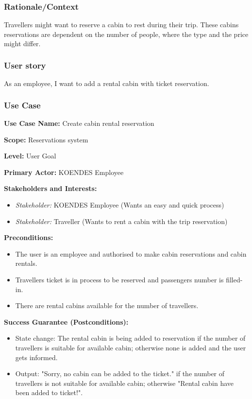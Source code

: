 \subsubsection{Rationale/Context}
Travellers might want to reserve a cabin to rest during their trip. These cabins reservations are dependent on the number of people, where the type and the price might differ.
\subsubsection{User story}
As an employee, I want to add a rental cabin with ticket reservation.
\subsubsection{Use Case}
\creator{\studentC}

\textbf{Use Case Name:} Create cabin rental reservation

\textbf{Scope:} Reservations system

\textbf{Level:} User Goal

\textbf{Primary Actor:} KOENDES Employee

\textbf{Stakeholders and Interests:} 
\begin{itemize}
\item \textit{Stakeholder:} KOENDES Employee (Wants an easy and quick process)
\item \textit{Stakeholder:} Traveller (Wants to rent a cabin with the trip reservation)
\end{itemize}

\textbf{Preconditions:} 
\begin{itemize}
\item The user is an employee and authorised to make cabin reservations and cabin rentals.
\item Travellers ticket is in process to be reserved and passengers number is filled-in.
\item There are rental cabins available for the number of travellers.
\end{itemize}

\textbf{Success Guarantee (Postconditions):}
\begin{itemize}
\item State change: The rental cabin is being added to reservation if the number of travellers is suitable for available cabin; otherwise none is added and the user gets informed.
\item Output: "Sorry, no cabin can be added to the ticket." if the number of travellers is not suitable for available cabin; otherwise "Rental cabin have been added to ticket!".
\end{itemize}

